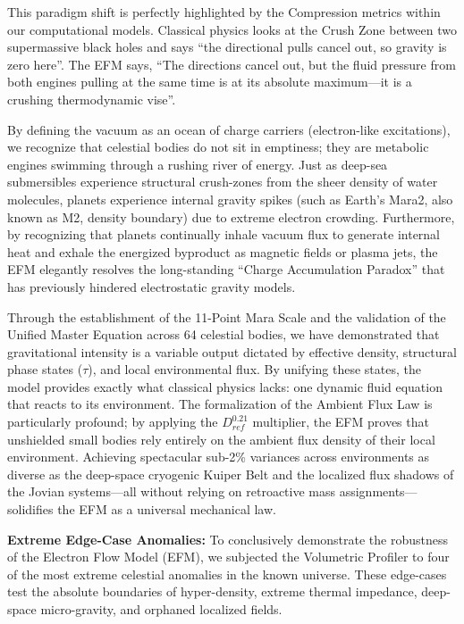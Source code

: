 \documentclass[11pt, a4paper]{article}
\begin{document}
  This paradigm shift is perfectly highlighted by the Compression metrics within our computational models. Classical physics looks at the Crush Zone between two supermassive black holes and says ``the directional pulls cancel out, so gravity is zero here''. The EFM says, ``The directions cancel out, but the fluid pressure from both engines pulling at the same time is at its absolute maximum---it is a crushing thermodynamic vise''.

  By defining the vacuum as an ocean of charge carriers (electron-like excitations), we recognize that celestial bodies do not sit in emptiness; they are metabolic engines swimming through a rushing river of energy. Just as deep-sea submersibles experience structural crush-zones from the sheer density of water molecules, planets experience internal gravity spikes (such as Earth's Mara2, also known as M2, density boundary) due to extreme electron crowding. Furthermore, by recognizing that planets continually inhale vacuum flux to generate internal heat and exhale the energized byproduct as magnetic fields or plasma jets, the EFM elegantly resolves the long-standing ``Charge Accumulation Paradox'' that has previously hindered electrostatic gravity models.

  Through the establishment of the 11-Point Mara Scale and the validation of the Unified Master Equation across 64 celestial bodies, we have demonstrated that gravitational intensity is a variable output dictated by effective density, structural phase states ($\tau$), and local environmental flux. By unifying these states, the model provides exactly what classical physics lacks: one dynamic fluid equation that reacts to its environment. The formalization of the Ambient Flux Law is particularly profound; by applying the $D_{ref}^{0.21}$ multiplier, the EFM proves that unshielded small bodies rely entirely on the ambient flux density of their local environment. Achieving spectacular sub-2\% variances across environments as diverse as the deep-space cryogenic Kuiper Belt and the localized flux shadows of the Jovian systems---all without relying on retroactive mass assignments---solidifies the EFM as a universal mechanical law.

  \textbf{Extreme Edge-Case Anomalies:} To conclusively demonstrate the robustness of the Electron Flow Model (EFM), we subjected the Volumetric Profiler to four of the most extreme celestial anomalies in the known universe. These edge-cases test the absolute boundaries of hyper-density, extreme thermal impedance, deep-space micro-gravity, and orphaned localized fields.
\end{document}
